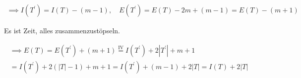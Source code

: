\begin{solution}
\begin{enumerate}[label = \alph*]
    \begin{align*}
        \implies
        I(T^\prime) = I(T) - (m - 1),
        \quad
        E(T^\prime) = E(T) - 2 m + (m - 1) = E(T) - (m + 1)
    \end{align*}

    Es ist Zeit, alles zusammenzustöpseln.

    \begin{multline*}
        \implies
        E(T)
        =
        E(T^\prime) + (m + 1)
        \stackrel
        {
            \mathrm{IV}
        }{=}
        I(T^\prime) + 2 |T^\prime| + m + 1 \\
        =
        I(T^\prime) + 2 (|T| - 1) + m + 1
        =
        I(T^\prime) + (m - 1) + 2 |T|
        =
        I(T) + 2 |T|
    \end{multline*}

\end{enumerate}

\end{solution}

